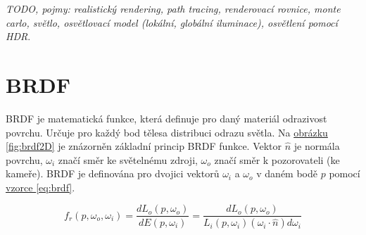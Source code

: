 \documentclass[czech,master]{diploma}
\newcommand{\uvec}[1]{\hat{#1}}
\newcommand{\point}{p}
\newcommand{\brdf}{f_r\left(\point,\omega_{o},\omega_{i}\right)}
\newcommand{\normVec}{\uvec{n}}
\newcommand{\inVec}{\omega_{i}}
\newcommand{\outVec}{\omega_{o}}
\newcommand{\outRadiance}{L_o \left( \point,\outVec \right)}
\newcommand{\inRadiance}{L_i \left( \point,\inVec \right)}
\newcommand{\irradiance}{E \left( \point, \inVec \right)}
\newcommand{\inDotNorm}{\left( \inVec \cdot \normVec \right)}
\begin{document}
\textit{TODO, pojmy:  realistický rendering, path tracing, renderovací rovnice, monte carlo, světlo, osvětlovací model (lokální, globální iluminace), osvětlení pomocí HDR}.

\clearpage
\chapter{BRDF}
BRDF je matematická funkce, která definuje pro daný materiál odrazivost povrchu. Určuje pro každý bod tělesa distribuci odrazu světla. Na \hyperref[fig:brdf2D]{obrázku \ref{fig:brdf2D}} je znázorněn základní princip BRDF funkce. Vektor \(\normVec\) je normála povrchu, \(\inVec\) značí směr ke světelnému zdroji, \(\outVec\) značí směr k pozorovateli (ke kameře). BRDF je definována pro dvojici vektorů  \(\inVec\) a \(\outVec\) v daném bodě \(p\) pomocí \hyperref[eq:brdf]{vzorce \ref{eq:brdf}}.

\begin{equation} \label{eq:brdf}
  \brdf = \frac{d\outRadiance}{d\irradiance} = \frac{d\outRadiance}{\inRadiance \inDotNorm d\inVec}
\end{equation}
\end{document}
